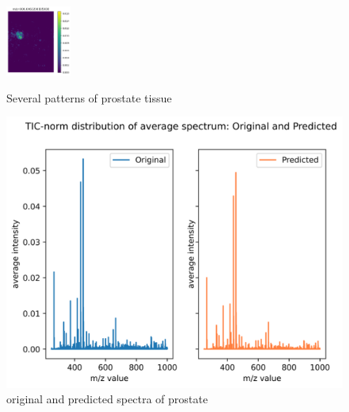 \documentclass[journal=jacsat,manuscript=article]{achemso}
\begin{document}
\newpage
\begin{figure}[htbp]
  \centering
  \begin{minipage}[c]{0.9\textwidth}
  {
    \includegraphics[width=0.19\textwidth]{pic/prostate/mz900.0463.png}
  } 
  \end{minipage}
  \caption{Several patterns of prostate tissue}
  \label{fig:Several patterns of prostate tissue}
\end{figure}
\begin{figure}[htbp]
  \includegraphics[width=\textwidth]{pic/prostate/ori_pre.png}
  \caption{original and predicted spectra of prostate}
  \label{ori_pre}
\end{figure}
\end{document}
